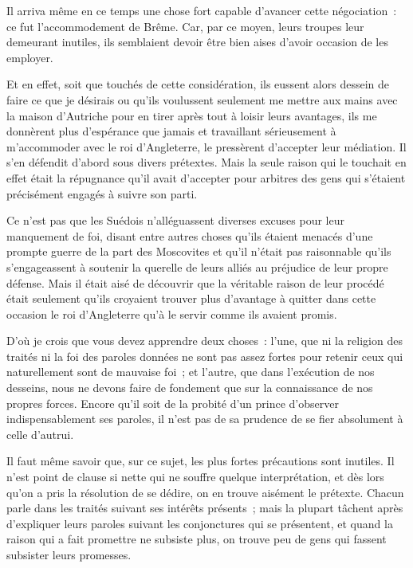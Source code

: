 \documentclass[french,twoside]{book} %
\begin{document}
Il arriva même en ce temps une chose fort capable d’avancer cette négociation : ce fut l’accommodement de Brême. Car, par ce moyen, leurs troupes leur demeurant inutiles, ils semblaient devoir être bien aises d’avoir occasion de les employer.\par
Et en effet, soit que touchés de cette considération, ils eussent alors dessein de faire ce que je désirais ou qu’ils voulussent seulement me mettre aux mains avec la maison d’Autriche pour en tirer après tout à loisir leurs avantages, ils me donnèrent plus d’espérance que jamais et travaillant sérieusement à m’accommoder avec le roi d’Angleterre, le pressèrent d’accepter leur médiation. Il s’en défendit d’abord sous divers prétextes. Mais la seule raison qui le touchait en effet était la répugnance qu’il avait d’accepter pour arbitres des gens qui s’étaient précisément engagés à suivre son parti.\par
Ce n’est pas que les Suédois n’alléguassent diverses excuses pour leur manquement de foi, disant entre autres choses qu’ils étaient menacés d’une prompte guerre de la part des Moscovites et qu’il n’était pas raisonnable qu’ils s’engageassent à soutenir la querelle de leurs alliés au préjudice de leur propre défense. Mais il était aisé de découvrir que la véritable raison de leur procédé était seulement qu’ils croyaient trouver plus d’avantage à quitter dans cette occasion le roi d’Angleterre qu’à le servir comme ils avaient promis.\par
D’où je crois que vous devez apprendre deux choses : l’une, que ni la religion des traités ni la foi des paroles données ne sont pas assez fortes pour retenir ceux qui naturellement sont de mauvaise foi ; et l’autre, que dans l’exécution de nos desseins, nous ne devons faire de fondement que sur la connaissance de nos propres forces. Encore qu’il soit de la probité d’un prince d’observer indispensablement ses paroles, il n’est pas de sa prudence de se fier absolument à celle d’autrui.\par
Il faut même savoir que, sur ce sujet, les plus fortes précautions sont inutiles. Il n’est point de clause si nette qui ne souffre quelque interprétation, et dès lors qu’on a pris la résolution de se dédire, on en trouve aisément le prétexte. Chacun parle dans les traités suivant ses intérêts présents ; mais la plupart tâchent après d’expliquer leurs paroles suivant les conjonctures qui se présentent, et quand la raison qui a fait promettre ne subsiste plus, on trouve peu de gens qui fassent subsister leurs promesses.\par
\end{document}
